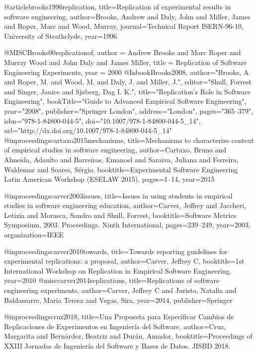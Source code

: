 @article{brooks1996replication,
  title={Replication of experimental results in software engineering},
 author={Brooks, Andrew and Daly, John and Miller, James and Roper, Marc and Wood, Murray},
  journal={Technical Report ISERN-96-10, University of Strathclyde},
  year={1996}
}

@MISC{Brooks00replicationof,
    author = {Andrew Brooks and Marc Roper and Murray Wood and John Daly and James Miller},
    title = {Replication of Software Engineering Experiments},
    year = {2000}
}
@Inbook{Brooks2008,
author="Brooks, A.
and Roper, M.
and Wood, M.
and Daly, J.
and Miller, J.",
editor="Shull, Forrest
and Singer, Janice
and Sj{\o}berg, Dag I. K.",
title="Replication's Role in Software Engineering",
bookTitle="Guide to Advanced Empirical Software Engineering",
year="2008",
publisher="Springer London",
address="London",
pages="365--379",
isbn="978-1-84800-044-5",
doi="10.1007/978-1-84800-044-5_14",
url="http://dx.doi.org/10.1007/978-1-84800-044-5_14"
}
@inproceedings{cartaxo2015mechanisms,
  title={Mechanisms to characterize context of empirical studies in software engineering},
  author={Cartaxo, Bruno and Almeida, Adaulto and Barreiros, Emanoel and Saraiva, Juliana and Ferreira, Waldemar and Soares, S{\'e}rgio},
  booktitle={Experimental Software Engineering Latin American Workshop (ESELAW 2015)},
  pages={1--14},
  year={2015}
}

@inproceedings{carver2003issues, 
  title={Issues in using students in empirical studies in software engineering education},
  author={Carver, Jeffrey and Jaccheri, Letizia and Morasca, Sandro and Shull, Forrest},
  booktitle={Software Metrics Symposium, 2003. Proceedings. Ninth International},
  pages={239--249},
  year={2003},
  organization={IEEE}
}

@inproceedings{carver2010towards,
  title={Towards reporting guidelines for experimental replications: a proposal},
  author={Carver, Jeffrey C},
  booktitle={1st International Workshop on Replication in Empirical Software Engineering},
  year={2010}
}
@misc{carver2014replications,
  title={Replications of software engineering experiments},
  author={Carver, Jeffrey C and Juristo, Natalia and Baldassarre, Maria Teresa and Vegas, Sira},
  year={2014},
  publisher={Springer}
}

@inproceedings{cruz2018,
  title={Una Propuesta para Especificar Cambios de Replicaciones de Experimentos en Ingeniería del Software},
  author={Cruz, Margarita and Bernárdez, Beatriz and Durán, Amador},
  booktitle={Proceedings of XXIII Jornadas de Ingeniería del Software y Bases de Datos. JISBD 2018.}
}

